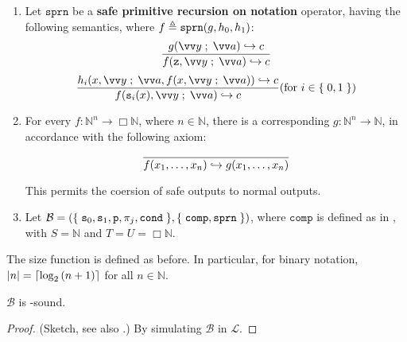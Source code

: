 \begin{definition}
\begin{enumerate}[label=(\arabic*)]
\item Let $\mathtt{sprn}$ be a \textbf{safe primitive recursion on notation}
operator, having the following semantics, where $f \triangleq
\mathtt{sprn}{\mathopen{}\left({g, h_0, h_1}\right)\mathclose{}}$:\begin{align*}
%
\judgement{
%
  g\p{\vect{y} \semic{} \vect{a}} \goesto c
%
}{
%
  f\p{\mathtt{z}, \vect{y} \semic{} \vect{a}} \goesto c
%
}\end{align*}\begin{align*}
%
\judgement{
%
  h_i\p{x, \vect{y} \semic{} \vect{a}, f\p{x,\vect{y} \semic{} \vect{a}}}
\goesto c
%
}{
%
  f\p{\mathtt{s}_i\p{x}, \vect{y} \semic{} \vect{a}} \goesto c
%
}\p{\text{for $i\in\set{0,1}$}}
%
\end{align*}

\item For every $f : \mathbb{N}^n \rightarrow \Box\mathbb{N}$, where $n \in
\mathbb{N}$, there is a corresponding $g : \mathbb{N}^n \rightarrow
\mathbb{N}$, in accordance with the following axiom:\begin{align*}
%
\axiom{f\p{x_1,\ldots,x_n} \goesto g\p{x_1,\ldots,x_n}}
%
\end{align*}

This permits the coersion of safe outputs to normal outputs.

\item Let $\mathcal{B} = {\mathopen{}\left({\mathopen{}\left\{\mathrel{}{\mathtt{s}_0, \mathtt{s}_1, \mathtt{p}, \pi_j,
\mathtt{cond}}\mathrel{}\right\}\mathclose{},\mathopen{}\left\{\mathrel{}{\mathtt{comp}, \mathtt{sprn}}\mathrel{}\right\}\mathclose{}}\right)\mathclose{}} $, where $\mathtt{comp}$ is
defined as in , with $S=\mathbb{N}$ and
$T=U=\Box\mathbb{N}$.

\end{enumerate}

\end{definition}

\begin{remark} The size function is defined as before. In particular, for
binary notation, ${\mathopen{}\left|{n}\right|\mathclose{}}=\mathopen{}\left\lceil{\log_2{\ensuremath{\mathopen{}\left({n+1}\right)\mathclose{}}}}\right\rceil\mathclose{}$ for all $n \in \mathbb{N}$.
\end{remark}

\begin{lemma} \label{lem:b-fptime-sound} $\mathcal{B}$ is \FPTIME{}-sound.
\end{lemma}

\begin{proof} (Sketch, see also \cite{bellantoni-cook-1992}.) By simulating
$\mathcal{B}$ in $\mathcal{L}$.   \end{proof}

